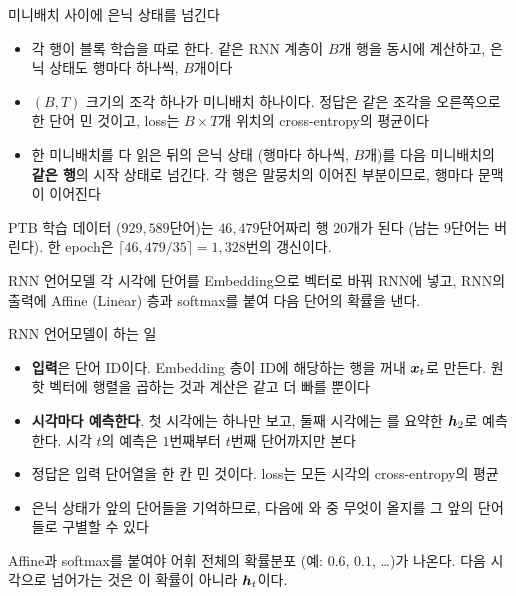 \documentclass[aspectratio=169,11pt]{beamer}
\begin{document}
\begin{frame}{미니배치 사이에 은닉 상태를 넘긴다}
\begin{itemize}
\item 각 행이 블록 학습을 따로 한다. 같은 RNN 계층이 $B$개 행을 동시에 계산하고,
은닉 상태도 행마다 하나씩, $B$개이다
\item $(B,T)$ 크기의 조각 하나가 미니배치 하나이다.
정답은 같은 조각을 오른쪽으로 한 단어 민 것이고, loss는 $B\times T$개 위치의 cross-entropy의 평균이다
\item 한 미니배치를 다 읽은 뒤의 은닉 상태 (행마다 하나씩, $B$개)를
다음 미니배치의 \textbf{같은 행}의 시작 상태로 넘긴다.
각 행은 말뭉치의 이어진 부분이므로, 행마다 문맥이 이어진다
\end{itemize}
\vskip2mm
\begin{keybox}[{{\texttt{rnnlm\_ptb.py}: $B=20$, $T=35$}}]
PTB 학습 데이터 ($929{,}589$단어)는 $46{,}479$단어짜리 행 $20$개가 된다 (남는 $9$단어는 버린다).
한 epoch은 $\lceil46{,}479/35\rceil=1{,}328$번의 갱신이다.
\end{keybox}
\end{frame}

\begin{frame}{RNN 언어모델}
\vskip1mm
각 시각에 단어를 Embedding으로 벡터로 바꿔 RNN에 넣고,
RNN의 출력에 Affine (Linear) 층과 softmax를 붙여 다음 단어의 확률을 낸다.
\end{frame}

\begin{frame}{RNN 언어모델이 하는 일}
\begin{itemize}
\item \textbf{입력}은 단어 ID이다. Embedding 층이 ID에 해당하는 행을 꺼내 $\bm{x}_t$로 만든다.
원핫 벡터에 행렬을 곱하는 것과 계산은 같고 더 빠를 뿐이다
\item \textbf{시각마다 예측한다}. 첫 시각에는  하나만 보고,
둘째 시각에는 를 요약한 $\bm{h}_2$로 예측한다.
시각 $t$의 예측은 $1$번째부터 $t$번째 단어까지만 본다
\item 정답은 입력 단어열을 한 칸 민 것이다. loss는 모든 시각의 cross-entropy의 평균
\item 은닉 상태가 앞의 단어들을 기억하므로,  다음에 와  중 무엇이 올지를
그 앞의 단어들로 구별할 수 있다
\end{itemize}
\vskip2mm
\begin{keybox}
Affine과 softmax를 붙여야 어휘 전체의 확률분포 (예:  $0.6$,  $0.1$, \dots)가 나온다.
다음 시각으로 넘어가는 것은 이 확률이 아니라 $\bm{h}_t$이다.
\end{keybox}
\end{frame}
\end{document}
